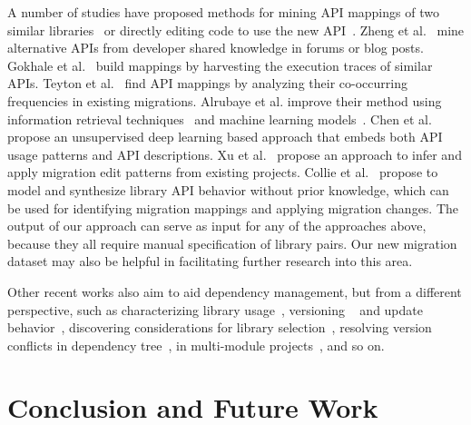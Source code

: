 \documentclass[conference, 10pt]{IEEEtran}
\begin{document}
A number of studies have proposed methods for mining API mappings of two similar libraries~\cite{2011FSE-Zheng-Cross, 2013ICSE-Gokhale-Inferring, 2013WCRE-Teyton-Automatic, 2019ICPC-Alrubaye-On, 2019TSE-Chen-Mining, 2020ASC-Alrubaye-Learning} or directly editing code to use the new API~\cite{2019ICPC-Xu-Meditor,2020ASE-Collie-M3}. 
Zheng et al.~\cite{2011FSE-Zheng-Cross} mine alternative APIs from developer shared knowledge in forums or blog posts. 
Gokhale et al.~\cite{2013ICSE-Gokhale-Inferring} build mappings by harvesting the execution traces of similar APIs. 
Teyton et al.~\cite{2013WCRE-Teyton-Automatic} find API mappings by analyzing their co-occurring frequencies in existing migrations. 
Alrubaye et al. improve their method using information retrieval techniques~\cite{2019ICPC-Alrubaye-On} and machine learning models~\cite{2020ASC-Alrubaye-Learning}.
Chen et al.~\cite{2019TSE-Chen-Mining} propose an unsupervised deep learning based approach that embeds both API usage patterns and API descriptions.
Xu et al.~\cite{2019ICPC-Xu-Meditor} propose an approach to infer and apply migration edit patterns from existing projects.
Collie et al.~\cite{2020ASE-Collie-M3} propose to model and synthesize library API behavior without prior knowledge, which can be used for identifying migration mappings and applying migration changes.
The output of our approach can serve as input for any of the approaches above, because they all require manual specification of library pairs. Our new migration dataset may also be helpful in facilitating further research into this area.

Other recent works also aim to aid dependency management, but from a different perspective, such as characterizing library usage~\cite{2020ICSME-Wang-Empirical}, versioning ~\cite{2019TSE-Decan-Semantic, 2019MSR-Dietrich-DependencyVersioning, 2019MSR-Valero-DiversityMaven} and update behavior~\cite{2018EMSE-Kula-Do}, discovering considerations for library selection~\cite{2018PROMISE-Mora-An, 2020FSE-Larios-Selecting}, resolving version conflicts in dependency tree~\cite{2018FSE-Wang-Do, 2020ICSE-Wang-Watchman}, in multi-module projects~\cite{2020FSE-Huang-Interactive}, and so on. 

\section{Conclusion and Future Work}
\end{document}
